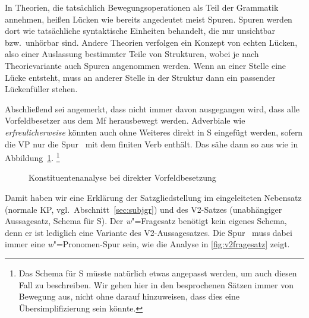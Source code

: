 In Theorien, die tatsächlich Bewegungsoperationen als Teil der Grammatik annehmen, heißen Lücken wie bereits angedeutet meist Spuren.
Spuren werden dort wie tatsächliche syntaktische Einheiten behandelt, die nur unsichtbar bzw.\ unhörbar sind.
Andere Theorien verfolgen ein Konzept von echten Lücken, also einer Auslassung bestimmter Teile von Strukturen, wobei je nach Theorievariante auch Spuren angenommen werden.
Wenn an einer Stelle eine Lücke entsteht, muss an anderer Stelle in der Struktur dann ein passender Lückenfüller stehen.

Abschließend sei angemerkt, dass nicht immer davon ausgegangen wird, dass alle Vorfeldbesetzer aus dem Mf herausbewegt werden.
Adverbiale wie \textit{erfreulicherweise} \zB könnten auch ohne Weiteres direkt in S eingefügt werden, sofern die VP nur die Spur \Ti\ mit dem finiten Verb enthält.
Das sähe dann so aus wie in Abbildung~\ref{fig:vorfelddirektbesetzung}.%
\footnote{Das Schema für S müsste natürlich etwas angepasst werden, um auch diesen Fall zu beschreiben.
Wir gehen hier in den besprochenen Sätzen immer von Bewegung aus, nicht ohne darauf hinzuweisen, dass dies eine Übersimplifizierung sein könnte.}

\begin{figure}
  \centering
  \vspace{0.3cm}
  \caption{Konstituentenanalyse bei direkter Vorfeldbesetzung}
  \label{fig:vorfelddirektbesetzung}
\end{figure}

Damit haben wir eine Erklärung der Satzgliedstellung im eingeleiteten Nebensatz (normale KP, vgl.\ Abschnitt~\ref{sec:subjgr}) und des V2-Satzes (unabhängiger Aussagesatz, Schema für S).
Der \textit{w}"=Fragesatz benötigt kein eigenes Schema, denn er ist lediglich eine Variante des V2-Aussagesatzes.
Die Spur \Tii\ muss dabei immer eine \textit{w}"=Pronomen-Spur sein, wie die Analyse in \ref{fig:v2fragesatz} zeigt.


